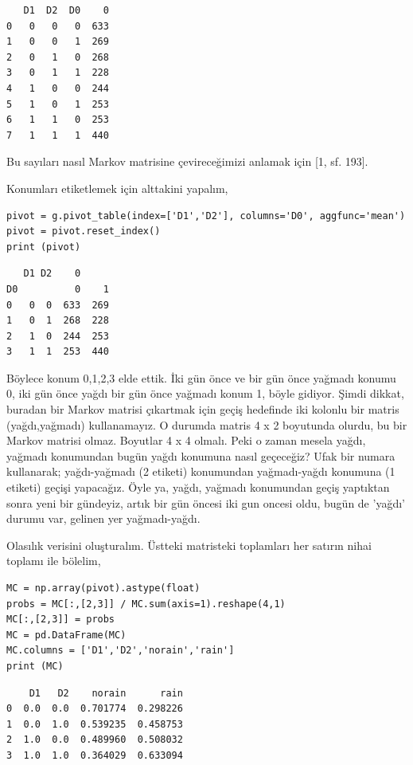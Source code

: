 \documentclass[12pt,fleqn]{article}\usepackage{../../common}
\begin{document}
\begin{verbatim}
   D1  D2  D0    0
0   0   0   0  633
1   0   0   1  269
2   0   1   0  268
3   0   1   1  228
4   1   0   0  244
5   1   0   1  253
6   1   1   0  253
7   1   1   1  440
\end{verbatim}

Bu sayıları nasıl Markov matrisine çevireceğimizi anlamak için [1, sf. 193].

Konumları etiketlemek için alttakini yapalım,

\begin{verbatim}
pivot = g.pivot_table(index=['D1','D2'], columns='D0', aggfunc='mean')
pivot = pivot.reset_index()
print (pivot)
\end{verbatim}

\begin{verbatim}
   D1 D2    0     
D0          0    1
0   0  0  633  269
1   0  1  268  228
2   1  0  244  253
3   1  1  253  440
\end{verbatim}

Böylece konum 0,1,2,3 elde ettik. İki gün önce ve bir gün önce yağmadı konumu 0,
iki gün önce yağdı bir gün önce yağmadı konum 1, böyle gidiyor. Şimdi dikkat,
buradan bir Markov matrisi çıkartmak için geçiş hedefinde iki kolonlu bir matris
(yağdı,yağmadı) kullanamayız. O durumda matris 4 x 2 boyutunda olurdu, bu bir
Markov matrisi olmaz. Boyutlar 4 x 4 olmalı. Peki o zaman mesela yağdı, yağmadı
konumundan bugün yağdı konumuna nasıl geçeceğiz? Ufak bir numara kullanarak;
yağdı-yağmadı (2 etiketi) konumundan yağmadı-yağdı konumuna (1 etiketi) geçişi
yapacağız. Öyle ya, yağdı, yağmadı konumundan geçiş yaptıktan sonra yeni bir
gündeyiz, artık bir gün öncesi iki gun oncesi oldu, bugün de 'yağdı' durumu var,
gelinen yer yağmadı-yağdı.

Olasılık verisini oluşturalım. Üstteki matristeki toplamları her satırın nihai
toplamı ile bölelim,

\begin{verbatim}
MC = np.array(pivot).astype(float)
probs = MC[:,[2,3]] / MC.sum(axis=1).reshape(4,1)
MC[:,[2,3]] = probs
MC = pd.DataFrame(MC)
MC.columns = ['D1','D2','norain','rain']
print (MC)
\end{verbatim}

\begin{verbatim}
    D1   D2    norain      rain
0  0.0  0.0  0.701774  0.298226
1  0.0  1.0  0.539235  0.458753
2  1.0  0.0  0.489960  0.508032
3  1.0  1.0  0.364029  0.633094
\end{verbatim}
\end{document}
